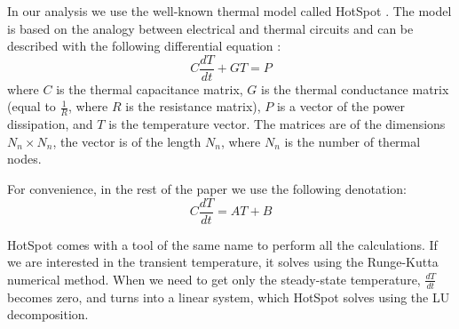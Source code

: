In our analysis we use the well-known thermal model called HotSpot \cite{huang2006}. The model is based on the analogy between electrical and thermal circuits and can be described with the following differential equation \cite{rao2008}:
\begin{equation} \label{eq:thermal-ode}
  C \frac{dT}{dt} + G T = P
\end{equation}
where $C$ is the thermal capacitance matrix, $G$ is the thermal conductance matrix (equal to $\frac{1}{R}$, where $R$ is the resistance matrix), $P$ is a vector of the power dissipation, and $T$ is the temperature vector. The matrices are of the dimensions $N_n \times N_n$, the vector is of the length $N_n$, where $N_n$ is the number of thermal nodes.

For convenience, in the rest of the paper we use the following denotation:
\begin{equation} \label{eq:initial}
  C \frac{dT}{dt} = A T + B
\end{equation}

HotSpot comes with a tool of the same name to perform all the calculations. If we are interested in the transient temperature, it solves  using the Runge-Kutta numerical method. When we need to get only the steady-state temperature, $\frac{dT}{dt}$ becomes zero, and  turns into a linear system, which HotSpot solves using the LU decomposition.
